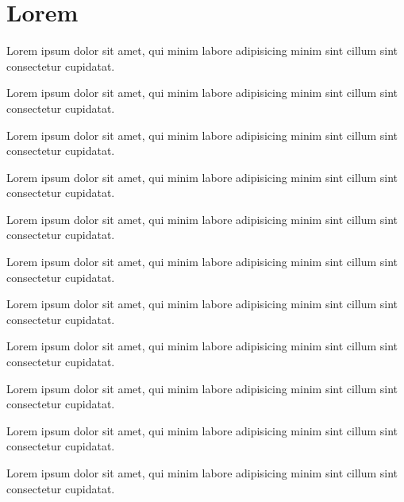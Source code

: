\documentclass[type=bachelor]{bithesis}
\begin{document}
\chapter{Lorem}

\begin{algo}[Lorem]
  \label{algo}
  Lorem ipsum dolor sit amet, qui minim labore adipisicing minim sint cillum sint consectetur cupidatat.
\end{algo}

\begin{them}[Lorem]
  \label{them}
  Lorem ipsum dolor sit amet, qui minim labore adipisicing minim sint cillum sint consectetur cupidatat.
\end{them}

\begin{lem}[Lorem]
  \label{lem}
  Lorem ipsum dolor sit amet, qui minim labore adipisicing minim sint cillum sint consectetur cupidatat.
\end{lem}

\begin{prop}[Lorem]
  \label{prop}
  Lorem ipsum dolor sit amet, qui minim labore adipisicing minim sint cillum sint consectetur cupidatat.
\end{prop}
\begin{cor}[Lorem]
  \label{cor}
  Lorem ipsum dolor sit amet, qui minim labore adipisicing minim sint cillum sint consectetur cupidatat.
\end{cor}
\begin{axi}[Lorem]
  \label{axi}
  Lorem ipsum dolor sit amet, qui minim labore adipisicing minim sint cillum sint consectetur cupidatat.
\end{axi}
\begin{defn}[Lorem]
  \label{defn}
  Lorem ipsum dolor sit amet, qui minim labore adipisicing minim sint cillum sint consectetur cupidatat.
\end{defn}
\begin{conj}[Lorem]
  \label{conj}
  Lorem ipsum dolor sit amet, qui minim labore adipisicing minim sint cillum sint consectetur cupidatat.
\end{conj}
\begin{exmp}[Lorem]
  \label{exmp}
  Lorem ipsum dolor sit amet, qui minim labore adipisicing minim sint cillum sint consectetur cupidatat.
\end{exmp}
\begin{case}[Lorem]
  \label{case}
  Lorem ipsum dolor sit amet, qui minim labore adipisicing minim sint cillum sint consectetur cupidatat.
\end{case}
\begin{rem}[Lorem]
  \label{rem}
  Lorem ipsum dolor sit amet, qui minim labore adipisicing minim sint cillum sint consectetur cupidatat.
\end{rem}
\end{document}
